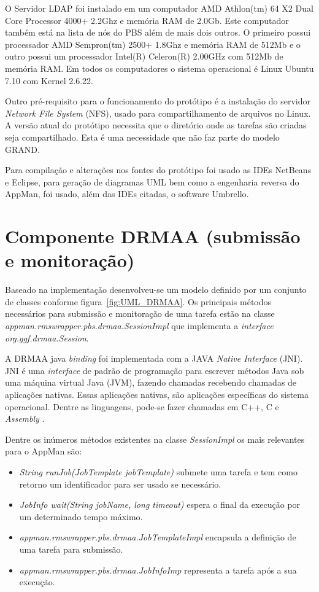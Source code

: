 O Servidor LDAP foi instalado em um computador AMD Athlon(tm) 64 X2 Dual Core Processor 4000+ 2.2Ghz e memória RAM de 2.0Gb. Este computador também está na lista de nós do PBS além de mais dois outros. O primeiro possui processador AMD Sempron(tm) 2500+ 1.8Ghz e memória RAM de 512Mb e o outro possui um processador Intel(R) Celeron(R) 2.00GHz com 512Mb de memória RAM. Em todos os computadores o sistema operacional é Linux Ubuntu 7.10 com Kernel 2.6.22.

Outro pré-requisito para o funcionamento do protótipo é a instalação do servidor \emph{Network File System} (NFS), usado para compartilhamento de arquivos no Linux. A versão atual do protótipo necessita que o diretório onde as tarefas são criadas seja compartilhado. Esta é uma necessidade que não faz parte do modelo GRAND.

Para compilação e alterações nos fontes do protótipo foi usado as IDEs NetBeans\cite{netbeans} e Eclipse\cite{eclipse}, para geração de diagramas UML bem como a engenharia reversa do AppMan, foi usado, além das IDEs citadas, o software Umbrello\cite{umbrello}.

\section{Componente DRMAA (submissão e monitoração)}

Baseado na implementação desenvolveu-se um modelo definido por um conjunto de classes conforme figura~\ref{fig:UML_DRMAA}. Os principais métodos necessários para submissão e monitoração de uma tarefa estão na classe \emph{appman.rmswrapper.pbs.drmaa.SessionImpl} que implementa a \emph{interface} \emph{org.ggf.drmaa.Session}.

A DRMAA java \emph{binding} foi implementada com a JAVA \emph{Native Interface} (JNI). JNI é uma \emph{interface} de padrão de programação para escrever métodos Java sob uma máquina virtual Java (JVM), fazendo chamadas recebendo chamadas de aplicações nativas. Essas aplicações nativas, são aplicações específicas do sistema operacional. Dentre as linguagens, pode-se fazer chamadas em C++, C e \emph{Assembly} \cite{jni}.

Dentre os inúmeros métodos existentes na classe \emph{SessionImpl} os mais relevantes para o AppMan são:

\begin{itemize}
	\item \emph{String runJob(JobTemplate jobTemplate)} submete uma tarefa e tem como retorno um identificador para ser usado se necessário.
	\item \emph{JobInfo wait(String jobName, long timeout)} espera o final da execução por um determinado tempo máximo.
	\item \emph{appman.rmswrapper.pbs.drmaa.JobTemplateImpl} encapsula a definição de uma tarefa para submissão.
	\item \emph{appman.rmswrapper.pbs.drmaa.JobInfoImp} representa a tarefa após a sua execução.
\end{itemize}

